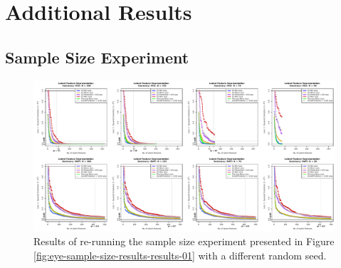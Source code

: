 \section{Additional Results}\label{sec:additional-results}

\subsection{Sample Size Experiment}

\begin{figure}
    \centering
    \includegraphics[width=1\linewidth]{figures/eye-sample-size-results-results-02.pdf}
    \caption{Results of re-running the sample size experiment presented in Figure \ref{fig:eye-sample-size-results-results-01} with a different random seed.}
    \label{fig:eye-sample-size-results-results-02}
\end{figure}